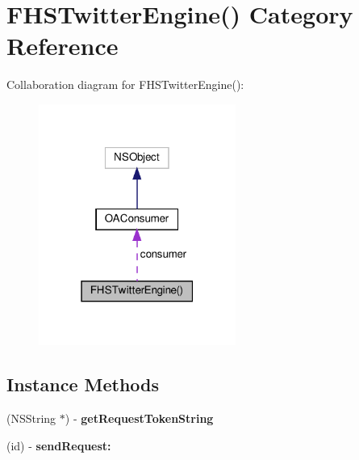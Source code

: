 \hypertarget{categoryFHSTwitterEngine_07_08}{}\section{F\+H\+S\+Twitter\+Engine() Category Reference}
\label{categoryFHSTwitterEngine_07_08}


Collaboration diagram for F\+H\+S\+Twitter\+Engine()\+:
\nopagebreak
\begin{figure}[H]
\begin{center}
\leavevmode
\includegraphics[width=183pt]{categoryFHSTwitterEngine_07_08__coll__graph}
\end{center}
\end{figure}
\subsection*{Instance Methods}
\begin{DoxyCompactItemize}
\item 
\mbox{\label{categoryFHSTwitterEngine_07_08_aec0556e6f7c59ffe0cec304295adb552}} 
(N\+S\+String $\ast$) -\/ {\bfseries get\+Request\+Token\+String}
\item 
\mbox{\label{categoryFHSTwitterEngine_07_08_a6d9d28ce5f2b1a47a3c06df121c51516}} 
(id) -\/ {\bfseries send\+Request\+:}
\end{DoxyCompactItemize}
